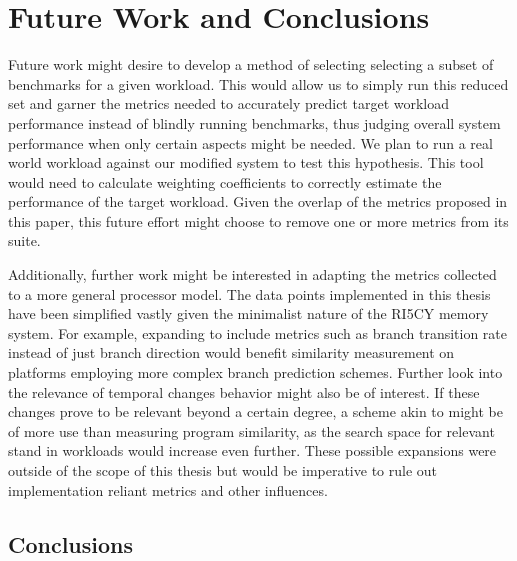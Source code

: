 \documentclass[../bachelor_paper.tex]{subfiles}
\begin{document}
\chapter{Future Work and Conclusions}
    \label{ch:future-conc}
Future work might desire to develop a method of selecting selecting a subset of benchmarks for a given workload. This would allow us to simply run this reduced set and garner the metrics needed to accurately predict target workload performance instead of blindly running benchmarks, thus judging overall system performance when only certain aspects might be needed. We plan to run a real world workload against our modified system to test this hypothesis. This tool would need to calculate weighting coefficients to correctly estimate the performance of the target workload. Given the overlap of the metrics proposed in this paper, this future effort might choose to remove one or more metrics from its suite.

Additionally, further work might be interested in adapting the metrics collected to a more general processor model. The data points implemented in this thesis have been simplified vastly given the minimalist nature of the RI5CY memory system. For example, expanding to include metrics such as branch transition rate \cite{haungsBranchTransitionRate2000} instead of just branch direction would benefit similarity measurement on platforms employing more complex branch prediction schemes. Further look into the relevance of temporal changes behavior might also be of interest. If these changes prove to be relevant beyond a certain degree, a scheme akin to \cite{joshiDistillingEssenceProprietary2008} might be of more use than measuring program similarity, as the search space for relevant stand in workloads would increase even further. These possible expansions were outside of the scope of this thesis but would be imperative to rule out implementation reliant metrics and other influences.


\section{Conclusions}
    \label{sec:fut/conc}
    
\end{document}
